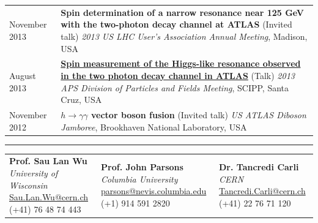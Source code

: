 \documentclass{letter}
\begin{document}
\begin{tabular}{p{}p{}}
  November 2013
  &
  \textbf{Spin determination of a narrow resonance near 125 GeV with the two-photon decay channel at ATLAS} (Invited talk) \newline
  \textit{2013 US LHC User's Association Annual Meeting}, Madison, USA \newline
  \\

  August 2013
  &
  \href{https://indico.bnl.gov/contributionDisplay.py?contribId=155&sessionId=9&confId=603}{\textbf{Spin measurement of the Higgs-like resonance observed in the two photon decay channel in ATLAS}} (Talk) \newline
  \textit{2013 APS Division of Particles and Fields Meeting}, SCIPP, Santa Cruz, USA \newline
  \\

  November 2012
  &
  \textbf{$h\rightarrow \gamma \gamma$ vector boson fusion} (Invited talk) \newline
  \textit{US ATLAS Diboson Jamboree}, Brookhaven National Laboratory, USA \newline


\end{tabular}
\vspace{-10pt}


\begin{flushleft}
  \Large{\textsc{\textbf{\color{Maroon}{References}}}}
  \hrule
\end{flushleft}

\begin{tabular}{p{}p{}p{}}
  \textbf{Prof. Sau Lan Wu} \newline
  \textit{University of Wisconsin} \newline
  \href{mailto:Sau.Lan.Wu@cern.ch}{Sau.Lan.Wu@cern.ch} \newline
  (+41) 76 48 74 443
  &
  \textbf{Prof. John Parsons} \newline
  \textit{Columbia University} \newline
  \href{mailto:parsons@nevis.columbia.edu}{parsons@nevis.columbia.edu} \newline
  (+1) 914 591 2820
  &
  \textbf{Dr. Tancredi Carli} \newline
  \textit{CERN} \newline
  \href{mailto:Tancredi.Carli@cern.ch}{Tancredi.Carli@cern.ch} \newline
  (+41) 22 76 71 120
\end{tabular}
\end{document}
